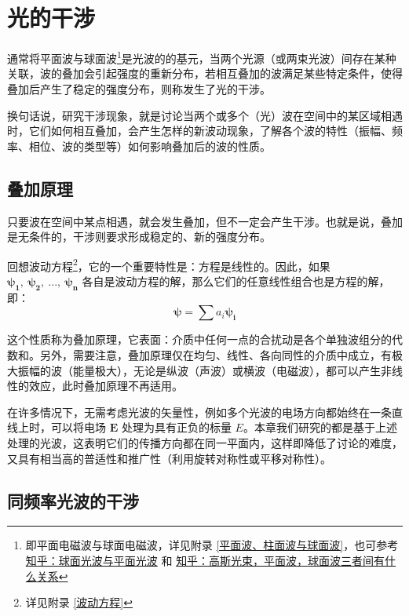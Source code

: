 \documentclass[UTF8]{report}
\theoremstyle{MyLineTheoremStyle} %
\theoremstyle{MyBlockTheoremStyle} %
\theoremstyle{MySubsubsectionStyle} %
\begin{document}
\chapter{光的干涉}\thispagestyle{fancy}


通常将平面波与球面波\footnote{即平面电磁波与球面电磁波，详见附录 \ref{平面波、柱面波与球面波}，也可参考 \href{https://www.zhihu.com/question/267133640/answer/319531458}{知乎：球面光波与平面光波} 和 \href{https://www.zhihu.com/question/534511391/answer/2501271591}{知乎：高斯光束，平面波，球面波三者间有什么关系}}是光波的的基元，当两个光源（或两束光波）间存在某种关联，波的叠加会引起强度的重新分布，若相互叠加的波满足某些特定条件，使得叠加后产生了稳定的强度分布，则称发生了光的干涉。

换句话说，研究干涉现象，就是讨论当两个或多个（光）波在空间中的某区域相遇时，它们如何相互叠加，会产生怎样的新波动现象，了解各个波的特性（振幅、频率、相位、波的类型等）如何影响叠加后的波的性质。



\section{叠加原理}
只要波在空间中某点相遇，就会发生叠加，但不一定会产生干涉。也就是说，叠加是无条件的，干涉则要求形成稳定的、新的强度分布。

回想波动方程\footnote{详见附录 \ref{波动方程}}，它的一个重要特性是：方程是线性的。因此，如果 $\boldsymbol{\psi_1},\ \boldsymbol{\psi_2},\ ...,\ \boldsymbol{\psi_n}$ 各自是波动方程的解，那么它们的任意线性组合也是方程的解，即：
\begin{equation}
\boldsymbol{\psi} = \sum a_i \boldsymbol{\psi_i}
\end{equation}

这个性质称为叠加原理，它表面：介质中任何一点的合扰动是各个单独波组分的代数和。另外，需要注意，叠加原理仅在均匀、线性、各向同性的介质中成立，有极大振幅的波（能量极大），无论是纵波（声波）或横波（电磁波），都可以产生非线性的效应，此时叠加原理不再适用。

在许多情况下，无需考虑光波的矢量性，例如多个光波的电场方向都始终在一条直线上时，可以将电场 $\boldsymbol{E}$ 处理为具有正负的标量 $E$。本章我们研究的都是基于上述处理的光波，这表明它们的传播方向都在同一平面内，这样即降低了讨论的难度，又具有相当高的普适性和推广性（利用旋转对称性或平移对称性）。

\section{同频率光波的干涉}
\end{document}

